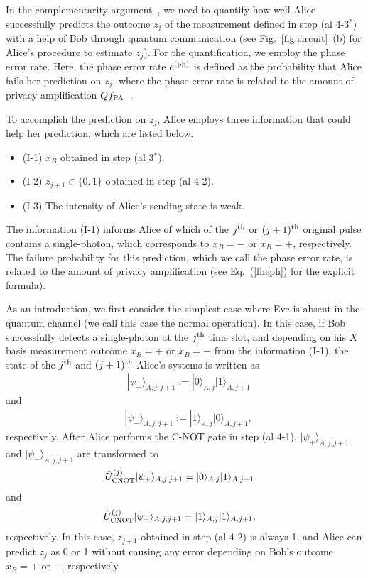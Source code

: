 \documentclass[prl,twocolumn,superscriptaddress,nofootinbib]{revtex4}
\def\U#1{{\rm #1}}
\newcommand{\ket}[1]{| #1 \rangle}
\begin{document}
  In the complementarity argument~\cite{Koashi2007}, we need to quantify how well Alice successfully predicts the outcome
  $z_j$ of the measurement defined in step (al 4-3$^*$) with a help of Bob through quantum communication 
  (see Fig.~\ref{fig:circuit}~(b) for Alice's procedure to estimate $z_j$).
  For the quantification, we employ the phase error rate.
  Here, the phase error rate $e^{(\U{ph})}$ is defined as the probability that Alice fails her prediction on $z_j$,
    where the phase error rate is related to the amount of privacy amplification $Qf_{\U{PA}}$~\cite{Koashi2009}. 
  
  To accomplish the prediction on $z_j$, Alice employs three information that could help her prediction, which
  are listed below. 
\begin{itemize}
\item (I-1) $x_B$ obtained in step (al 3$^\ast$).
\item(I-2) $z_{j+1}\in\{0,1\}$ obtained in step (al 4-2). 
\item  (I-3) The intensity of Alice's sending state is weak.
  \end{itemize}
  The information (I-1) informs Alice of which of the $j^{\U{th}}$ or $(j+1)^{\U{th}}$
  original pulse contains a single-photon, which corresponds to $x_B=-$ or $x_B=+$, respectively. 
  The failure probability for this prediction, which we call the phase error rate, is related to the amount of privacy amplification
  (see Eq.~(\ref{fheph}) for the explicit formula). 

  As an introduction, we first consider the simplest case where Eve is absent in the quantum channel
  (we call this case the normal operation).
  In this case, if Bob successfully detects a single-photon at the $j^{\U{th}}$ time slot, and 
  depending on his $X$ basis measurement outcome $x_B=+$ or $x_B=-$ from the information (I-1),
  the state of the $j^{\U{th}}$ and $(j+1)^{\U{th}}$ Alice's systems is written as 
  \begin{align}
   &\ket{\psi_+}_{A,j,j+1}:= \ket{0}_{A,j}\ket{1}_{A,j+1}
  \end{align}
  and
    \begin{align}
   &\ket{\psi_-}_{A,j,j+1}:=\ket{1}_{A,j}\ket{0}_{A,j+1},
  \end{align}
    respectively. 
    After Alice performs the C-NOT gate in step (al 4-1), $\ket{\psi_+}_{A,j,j+1}$ and $\ket{\psi_-}_{A,j,j+1}$ are transformed to 
    \begin{align}
      &\hat{U}^{(j)}_{\U{CNOT}}\ket{\psi_+}_{A,j,j+1}=\ket{0}_{A,j}\ket{1}_{A,j+1}
                \label{Uni+}
    \end{align}
    and
        \begin{align}
      &\hat{U}^{(j)}_{\U{CNOT}}\ket{\psi_-}_{A,j,j+1}=\ket{1}_{A,j}\ket{1}_{A,j+1},
          \label{Uni-}
    \end{align}
        respectively. 
        In this case, $z_{j+1}$ obtained in step (al 4-2) is always 1, and Alice can
        predict $z_j$ as 0 or 1 without causing any error depending on Bob's outcome $x_B=+$ or $-$, respectively. 
\end{document}
